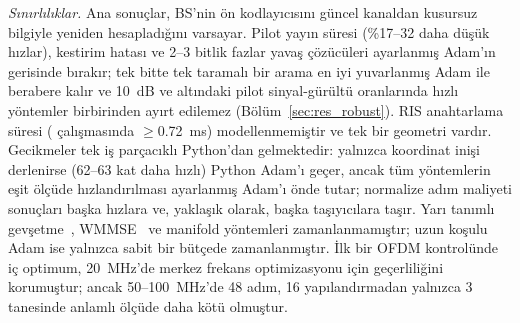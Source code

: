 \emph{Sınırlılıklar.} Ana sonuçlar, BS'nin ön kodlayıcısını güncel kanaldan kusursuz bilgiyle yeniden hesapladığını varsayar. Pilot yayın süresi (\%17--32 daha düşük hızlar), kestirim hatası ve 2--3 bitlik fazlar yavaş çözücüleri ayarlanmış Adam'ın gerisinde bırakır; tek bitte tek taramalı bir arama en iyi yuvarlanmış Adam ile berabere kalır ve 10~dB ve altındaki pilot sinyal-gürültü oranlarında hızlı yöntemler birbirinden ayırt edilemez (Bölüm~\ref{sec:res_robust}). RIS anahtarlama süresi (\cite{Zhao2024OJCOMS} çalışmasında $\ge$0.72~ms) modellenmemiştir ve tek bir geometri vardır. Gecikmeler tek iş parçacıklı Python'dan gelmektedir: yalnızca koordinat inişi derlenirse (62--63 kat daha hızlı) Python Adam'ı geçer, ancak tüm yöntemlerin eşit ölçüde hızlandırılması ayarlanmış Adam'ı önde tutar; normalize adım maliyeti sonuçları başka hızlara ve, yaklaşık olarak, başka taşıyıcılara taşır. Yarı tanımlı gevşetme~\cite{Wu2019TWC}, WMMSE~\cite{Choi2024TCOM} ve manifold yöntemleri zamanlanmamıştır; uzun koşulu Adam ise yalnızca sabit bir bütçede zamanlanmıştır. İlk bir OFDM kontrolünde iç optimum, 20~MHz'de merkez frekans optimizasyonu için geçerliliğini korumuştur; ancak 50--100~MHz'de 48 adım, 16 yapılandırmadan yalnızca 3 tanesinde anlamlı ölçüde daha kötü olmuştur.
